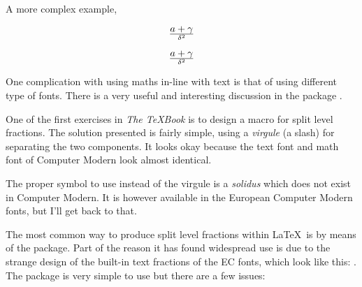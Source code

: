A more complex example,

\begin{teX}
\[
a+\gamma \over \delta^2
\]
\end{teX}

\[a+\gamma \over \delta^2\]

One complication with using maths in-line with text is that of using different type of fonts. There is a very useful and interesting discussion in the package . 

 One of the first exercises in \emph{The \TeX Book} is to design a
 macro for split level fractions. The solution presented is fairly
  simple, using a \emph{virgule} (a slash) for separating the two
  components. It looks okay because the text font and math font of
  Computer Modern look almost identical.

  The proper symbol to use instead of the virgule is a \emph{solidus}
  which does not exist in Computer Modern. It is however available in
  the European Computer Modern fonts, but I'll get back to that.

  The most common way to produce split level fractions within \LaTeX\
  is by means of the  package. Part of the reason it
  has found widespread use is due to the strange design of the
  built-in text fractions of the EC fonts, which look like this:
  \textonehalf. The package is very simple to use but there are a few
  issues:

